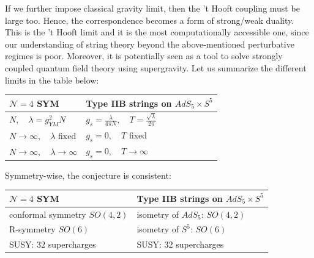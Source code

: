 If we further impose classical gravity limit, then
the 't Hooft coupling must be large too. 
Hence, the correspondence becomes a form of strong/weak duality.
This is the 't Hooft limit and it is the most computationally accessible one, 
since our understanding of string theory beyond the above-mentioned perturbative regimes is poor. 
Moreover, it is potentially seen as a tool to solve strongly coupled quantum field theory using supergravity.
Let us summarize the different limits in the table below:
\begin{center}
 \begin{tabular}{| l | l |}
 \hline
  $\mathcal{N}=4$ SYM & Type IIB strings on $AdS_5 \times S^5$ \\ \hline
  $N, \quad \lambda = g_{YM}^2 N$            & $g_s = \frac{\lambda}{4\pi N}, \quad T = \frac{\sqrt{\lambda}}{2 \pi} $ \\ %
  $N\rightarrow \infty, \quad \lambda$ fixed & $g_s=0, \quad T$ fixed \\  %
  $N\rightarrow \infty, \quad \lambda \rightarrow \infty$ & $g_s=0, \quad T \rightarrow \infty$ \\\hline %
\end{tabular}
\end{center}

Symmetry-wise, the conjecture is consistent:
\begin{center}
 \begin{tabular}{| l | l |}
 \hline
  $\mathcal{N}=4$ SYM    & Type IIB strings on $AdS_5 \times S^5$ \\ \hline
   conformal symmetry $SO(4,2)$   & isometry of $AdS_5$: $SO(4,2)$ \\ 
   R-symmetry $SO(6)$             & isometry of $S^5$: $SO(6)$ \\ 
   SUSY: 32 supercharges          & SUSY: 32 supercharges \\ \hline
\end{tabular}
\end{center}

